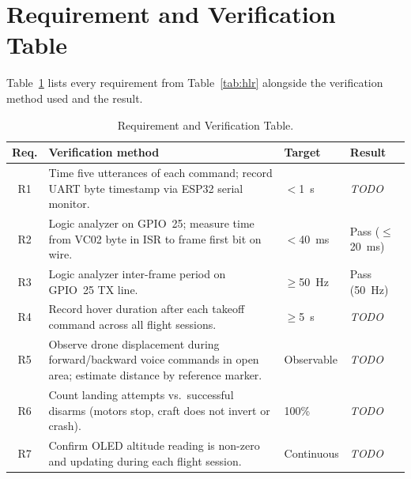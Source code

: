 \section{Requirement and Verification Table} \label{appendix:rvt}

Table~\ref{tab:rvt} lists every requirement from Table~\ref{tab:hlr} alongside the verification
method used and the result.

\begin{table}[htb!]
    \centering
    \caption{Requirement and Verification Table.}
    \label{tab:rvt}
    \begin{tabularx}{\linewidth}{c X l l}
        \hline
        \textbf{Req.} & \textbf{Verification method} & \textbf{Target} & \textbf{Result} \\
        \hline
        R1 & Time five utterances of each command; record UART byte timestamp via
             ESP32 serial monitor. &
             $<$1~s & \emph{TODO} \\
        R2 & Logic analyzer on GPIO~25; measure time from VC02 byte in ISR to frame
             first bit on wire. &
             $<$40~ms & Pass ($\leq$20~ms) \\
        R3 & Logic analyzer inter-frame period on GPIO~25 TX line. &
             $\geq$50~Hz & Pass (50~Hz) \\
        R4 & Record hover duration after each takeoff command across all flight sessions. &
             $\geq$5~s & \emph{TODO} \\
        R5 & Observe drone displacement during forward/backward voice commands in open
             area; estimate distance by reference marker. &
             Observable & \emph{TODO} \\
        R6 & Count landing attempts vs.\ successful disarms (motors stop, craft does not
             invert or crash). &
             100\% & \emph{TODO} \\
        R7 & Confirm OLED altitude reading is non-zero and updating during each flight
             session. &
             Continuous & \emph{TODO} \\
        \hline
    \end{tabularx}
\end{table}
